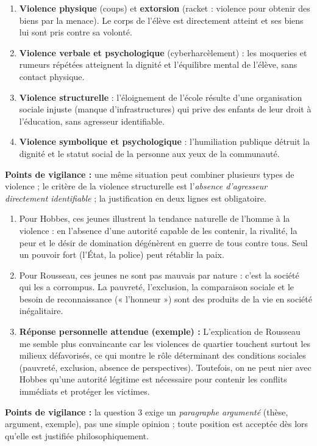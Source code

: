 \documentclass[11pt]{article}
\begin{document}
\begin{corrige}
\begin{enumerate}
\item \textbf{Violence physique} (coups) et \textbf{extorsion} (racket : violence pour obtenir des biens par la menace). Le corps de l'élève est directement atteint et ses biens lui sont pris contre sa volonté.
\item \textbf{Violence verbale et psychologique} (cyberharcèlement) : les moqueries et rumeurs répétées atteignent la dignité et l'équilibre mental de l'élève, sans contact physique.
\item \textbf{Violence structurelle} : l'éloignement de l'école résulte d'une organisation sociale injuste (manque d'infrastructures) qui prive des enfants de leur droit à l'éducation, sans agresseur identifiable.
\item \textbf{Violence symbolique et psychologique} : l'humiliation publique détruit la dignité et le statut social de la personne aux yeux de la communauté.
\end{enumerate}
\textbf{Points de vigilance :} une même situation peut combiner plusieurs types de violence ; le critère de la violence structurelle est l'\emph{absence d'agresseur directement identifiable} ; la justification en deux lignes est obligatoire.
\end{corrige}

\begin{corrige}
\begin{enumerate}
\item Pour Hobbes, ces jeunes illustrent la tendance naturelle de l'homme à la violence : en l'absence d'une autorité capable de les contenir, la rivalité, la peur et le désir de domination dégénèrent en guerre de tous contre tous. Seul un pouvoir fort (l'État, la police) peut rétablir la paix.
\item Pour Rousseau, ces jeunes ne sont pas mauvais par nature : c'est la société qui les a corrompus. La pauvreté, l'exclusion, la comparaison sociale et le besoin de reconnaissance (« l'honneur ») sont des produits de la vie en société inégalitaire.
\item \textbf{Réponse personnelle attendue (exemple) :} L'explication de Rousseau me semble plus convaincante car les violences de quartier touchent surtout les milieux défavorisés, ce qui montre le rôle déterminant des conditions sociales (pauvreté, exclusion, absence de perspectives). Toutefois, on ne peut nier avec Hobbes qu'une autorité légitime est nécessaire pour contenir les conflits immédiats et protéger les victimes.
\end{enumerate}
\textbf{Points de vigilance :} la question 3 exige un \emph{paragraphe argumenté} (thèse, argument, exemple), pas une simple opinion ; toute position est acceptée dès lors qu'elle est justifiée philosophiquement.
\end{corrige}
\end{document}
